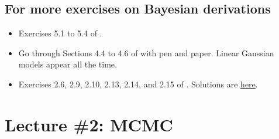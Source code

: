 \documentclass{article}
\newif\ifsolutions
\newcommand\solution[1]{
\ifsolutions
\begin{mdframed}[style=MyFrame]
\textcolor{bleu}{\textbf{Solution:} #1}
\end{mdframed}
\fi
}
\begin{document}
\solution{
We write Bayes' theorem and keep track only of the terms that won't end up in the normalization constant. This gives
\begin{align*}
\log p(\theta\vert y_{1:N}, x_{1:N}) &\propto \log p(y_{1:N}\vert x_{1:N},\theta) + \log p(\theta)\\
& \propto -\sum_{i=1}^N \frac{(y_i-x_i^T\theta)^2}{2\sigma^2} + \frac{1}{2\sigma_0^2}\Vert \theta\Vert^2\\
&= - \frac{1}{2\sigma^2}\Vert y-X\theta\Vert^2 + \frac{1}{2\sigma_0^2}\Vert \theta\Vert^2\\
&\propto - \frac{1}{2\sigma^2} \left[\theta^T \left(X^TX + \frac{\sigma^2}{\sigma_0^2}I_d\right) \theta - 2y^T X\theta\right]\\
&= -\frac12 \left[\theta^T \Lambda \theta - \frac{2}{\sigma^2}y^T X\theta\right],
\end{align*}
where $\Lambda:=\frac{1}{\sigma^2} X^TX + \frac{1}{\sigma_0^2}I_d$ is symmetric and positive definite. This leads to
$$
\log p(\theta\vert y_{1:N}, x_{1:N}) \propto -\frac12 \left(\theta-\frac{1}{\sigma^2}\Lambda^{-1} X^Ty\right)^T \Lambda \left(\theta-\frac{1}{\sigma^2}\Lambda^{-1}X^Ty\right),
$$
so that $\theta\vert y_{1:N}, x_{1:N}$ is indeed Gaussian, with mean the ridge regression estimator
$$ \frac{1}{\sigma^2}\Lambda^{-1}X^Ty = \left( X^TX + \frac{\sigma^2}{\sigma_0^2}I_d\right)^{-1} X^Ty
$$
and variance $\Lambda^{-1}$. Note how the ratio $\sigma/\sigma_0$ is playing the role of the regularization parameter in ridge regression.
}

 \subsection{For more exercises on Bayesian derivations}
 \begin{itemize}
   \item Exercises 5.1 to 5.4 of \citep{Mur12}.
   \item Go through Sections 4.4 to 4.6 of \citep{Mur12} with pen and paper. Linear Gaussian models appear all the time.
   \item Exercises 2.6, 2.9, 2.10, 2.13, 2.14, and 2.15 of \citep{MaRo07}. Solutions are \href{https://arxiv.org/abs/0910.4696}{here}.
 \end{itemize}

\section{Lecture \#2: MCMC}
\end{document}
